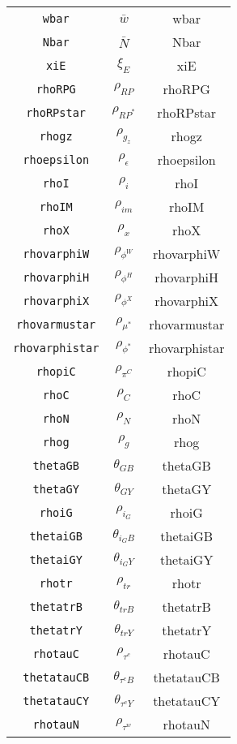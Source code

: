 \begin{center}
\begin{longtable}{ccc}
\texttt{wbar} & $\bar{w}$ & wbar\\
\texttt{Nbar} & $\bar{N}$ & Nbar\\
\texttt{xiE} & $\xi_E$ & xiE\\
\texttt{rhoRPG} & $\rho_{RP}$ & rhoRPG\\
\texttt{rhoRPstar} & $\rho_{RP^*}$ & rhoRPstar\\
\texttt{rhogz} & $\rho_{g_z}$ & rhogz\\
\texttt{rhoepsilon} & $\rho_{\epsilon}$ & rhoepsilon\\
\texttt{rhoI} & $\rho_{i}$ & rhoI\\
\texttt{rhoIM} & $\rho_{im}$ & rhoIM\\
\texttt{rhoX} & $\rho_{x}$ & rhoX\\
\texttt{rhovarphiW} & $\rho_{\phi^W}$ & rhovarphiW\\
\texttt{rhovarphiH} & $\rho_{\phi^H}$ & rhovarphiH\\
\texttt{rhovarphiX} & $\rho_{\phi^X}$ & rhovarphiX\\
\texttt{rhovarmustar} & $\rho_{\mu^*}$ & rhovarmustar\\
\texttt{rhovarphistar} & $\rho_{\phi^*}$ & rhovarphistar\\
\texttt{rhopiC} & $\rho_{\pi^C}$ & rhopiC\\
\texttt{rhoC} & $\rho_{C}$ & rhoC\\
\texttt{rhoN} & $\rho_{N}$ & rhoN\\
\texttt{rhog} & $\rho_{g}$ & rhog\\
\texttt{thetaGB} & $\theta_{GB}$ & thetaGB\\
\texttt{thetaGY} & $\theta_{GY}$ & thetaGY\\
\texttt{rhoiG} & $\rho_{i_G}$ & rhoiG\\
\texttt{thetaiGB} & $\theta_{i_GB}$ & thetaiGB\\
\texttt{thetaiGY} & $\theta_{i_GY}$ & thetaiGY\\
\texttt{rhotr} & $\rho_{tr}$ & rhotr\\
\texttt{thetatrB} & $\theta_{trB}$ & thetatrB\\
\texttt{thetatrY} & $\theta_{trY}$ & thetatrY\\
\texttt{rhotauC} & $\rho_{\tau^c}$ & rhotauC\\
\texttt{thetatauCB} & $\theta_{\tau^cB}$ & thetatauCB\\
\texttt{thetatauCY} & $\theta_{\tau^cY}$ & thetatauCY\\
\texttt{rhotauN} & $\rho_{\tau^w}$ & rhotauN\\

\end{longtable}
\end{center}
